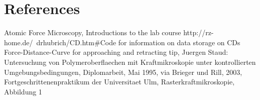 \section{References}

\begin{thebibliography}{00}   %

 Atomic Force Microscopy, Introductions to the lab course 
 http://rz-home.de/~drhubrich/CD.htm\#Code for information on data storage on CDs
 Force-Distance-Curve for approaching and retracting tip, Juergen Staud: Untersuchung von Polymeroberflaechen mit Kraftmikroskopie unter kontrollierten Umgebungsbedingungen, Diplomarbeit, Mai 1995, via Brieger und Rill, 2003, Fortgeschrittenenpraktikum der Universitaet Ulm, Rasterkraftmikroskopie, Abbildung 1

\end{thebibliography} 